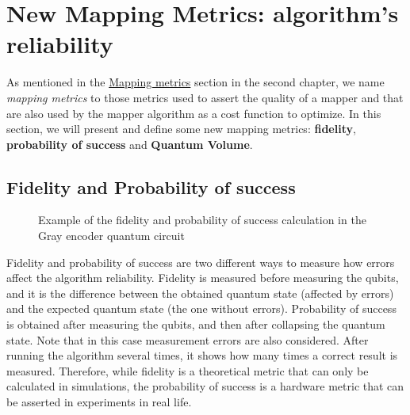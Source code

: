 \section{New Mapping Metrics: algorithm's reliability}
\label{sec:org27990de}
As mentioned in the \hyperref[sec:orgc729465]{Mapping metrics} section in the second chapter, we name \emph{mapping metrics} to those metrics used to assert the quality of a mapper and that are also used by the mapper algorithm as a cost function to optimize.
In this section, we will present and  define some new mapping metrics: \textbf{fidelity}, \textbf{probability of success} and \textbf{Quantum Volume}.

\subsection{Fidelity and Probability of success}
\label{sec:org0c7b2c2}

\begin{figure}
    \centering

\caption{Example of the fidelity and probability of success calculation in the Gray encoder quantum circuit}
\label{fig:latency_swaps_ex_orig}
\end{figure}

Fidelity and probability of success  are two different ways to measure how errors affect the algorithm reliability.
Fidelity is measured before measuring the qubits, and it is the difference between the obtained quantum state (affected by errors) and the expected quantum state (the one without errors).  Probability of success is obtained after measuring the qubits, and then  after collapsing the quantum state. Note that in this case measurement errors are also considered. After running the algorithm several times, it shows how many times a correct result is measured.
Therefore, while fidelity is a theoretical metric that can only be calculated in simulations, the probability of success is a hardware metric that can be asserted in experiments in real life.

